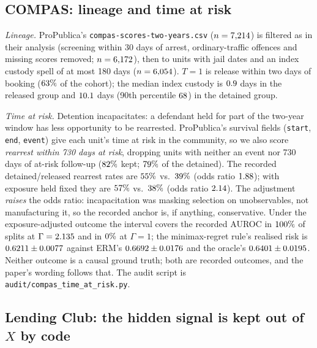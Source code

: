 \subsection{COMPAS: lineage and time at risk}
\label{app:compas-audit}

\emph{Lineage.} ProPublica's \texttt{compas-scores-two-years.csv}
($n=7{,}214$) is filtered as in their analysis (screening within 30
days of arrest, ordinary-traffic offences and missing scores removed;
$n=6{,}172$), then to units with jail dates and an index
custody spell of at most 180 days ($n=6{,}054$). $T=1$ is release
within two days of booking ($63\%$ of the cohort); the
median index custody is $0.9$ days in the
released group and $10.1$ days (90th percentile
$68$) in the detained group.

\emph{Time at risk.} Detention incapacitates: a defendant held for part of the
two-year window has less opportunity to be rearrested. ProPublica's survival
fields (\texttt{start}, \texttt{end}, \texttt{event}) give each unit's time
at risk in the community, so we also score \emph{rearrest within 730 days at
risk}, dropping units with neither an event nor 730 days of at-risk
follow-up ($82\%$ kept; $79\%$ of the
detained). The recorded detained/released rearrest rates are
$55\%$ vs.\ $39\%$ (odds ratio
$1.88$); with exposure held fixed they are
$57\%$ vs.\ $38\%$ (odds ratio
$2.14$). The adjustment \emph{raises} the odds ratio:
incapacitation was masking selection on unobservables, not manufacturing it,
so the recorded anchor is, if anything, conservative. Under the
exposure-adjusted outcome the interval covers the recorded AUROC in
$100\%$ of splits at $\Gamma=2.135$ and in
$0\%$ at $\Gamma=1$; the minimax-regret rule's realised risk
is $0.6211\pm0.0077$ against ERM's
$0.6692\pm0.0176$ and the oracle's
$0.6401\pm0.0195$. Neither outcome is a
causal ground truth; both are recorded outcomes, and the paper's wording
follows that. The audit script is \texttt{audit/compas\_time\_at\_risk.py}.

\subsection{Lending Club: the hidden signal is kept out of $X$ by code}
\label{app:lending-guard}

